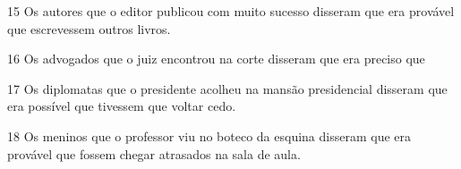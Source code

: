 15
Os autores que o editor publicou com muito sucesso disseram que era provável que escrevessem outros livros.

16
Os advogados que o juiz encontrou na corte disseram que era preciso que 

17
Os diplomatas que o presidente acolheu na mansão presidencial disseram que era possível que tivessem que voltar cedo.

18
Os meninos que o professor viu no boteco da esquina disseram que era provável que fossem chegar atrasados na sala de aula. 








